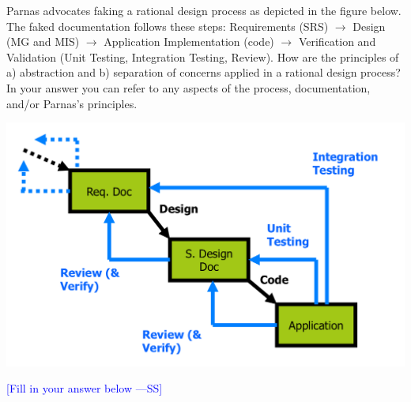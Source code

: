 \documentclass[12pt,fleqn]{examtst}
\newcommand{\authornote}[3]{\textcolor{#1}{[#3 ---#2]}}
\newcommand{\authornote}[3]{}
\newcommand{\wss}[1]{\authornote{blue}{SS}{#1}}
\begin{document}
Parnas advocates faking a rational design process as depicted in the figure below.
The faked documentation follows these steps: Requirements (SRS) $\rightarrow$
Design (MG and MIS) $\rightarrow$ Application Implementation (code)
$\rightarrow$ Verification and Validation (Unit Testing, Integration Testing,
Review).  How are the principles of
a) abstraction and b) separation of concerns applied in a rational design
process?  In your answer you can refer to any aspects of the process,
documentation, and/or Parnas's principles.

\includegraphics[scale=0.4]{SoftwareLifecycle.png}

\noindent \wss{Fill in your answer below}
\end{document}

